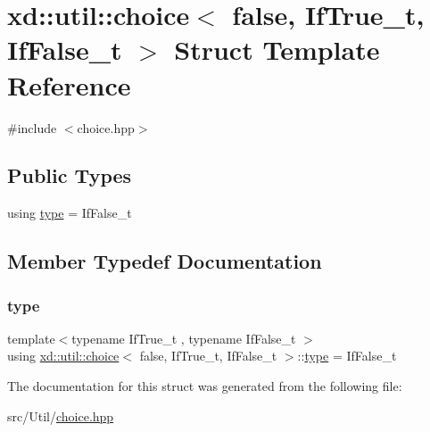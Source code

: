 \hypertarget{structxd_1_1util_1_1choice_3_01false_00_01_if_true__t_00_01_if_false__t_01_4}{}\section{xd\+:\+:util\+:\+:choice$<$ false, If\+True\+\_\+t, If\+False\+\_\+t $>$ Struct Template Reference}
\label{structxd_1_1util_1_1choice_3_01false_00_01_if_true__t_00_01_if_false__t_01_4}


{\ttfamily \#include $<$choice.\+hpp$>$}

\subsection*{Public Types}
\begin{DoxyCompactItemize}
\item 
using \mbox{\hyperlink{structxd_1_1util_1_1choice_3_01false_00_01_if_true__t_00_01_if_false__t_01_4_a3c66d5da5e7dcea7e22008e354154b78}{type}} = If\+False\+\_\+t
\end{DoxyCompactItemize}


\subsection{Member Typedef Documentation}
\mbox{\label{structxd_1_1util_1_1choice_3_01false_00_01_if_true__t_00_01_if_false__t_01_4_a3c66d5da5e7dcea7e22008e354154b78}} 
\subsubsection{\texorpdfstring{type}{type}}
{\footnotesize\ttfamily template$<$typename If\+True\+\_\+t , typename If\+False\+\_\+t $>$ \\
using \mbox{\hyperlink{structxd_1_1util_1_1choice}{xd\+::util\+::choice}}$<$ false, If\+True\+\_\+t, If\+False\+\_\+t $>$\+::\mbox{\hyperlink{structxd_1_1util_1_1choice_3_01false_00_01_if_true__t_00_01_if_false__t_01_4_a3c66d5da5e7dcea7e22008e354154b78}{type}} =  If\+False\+\_\+t}



The documentation for this struct was generated from the following file\+:\begin{DoxyCompactItemize}
\item 
src/\+Util/\mbox{\hyperlink{choice_8hpp}{choice.\+hpp}}\end{DoxyCompactItemize}
